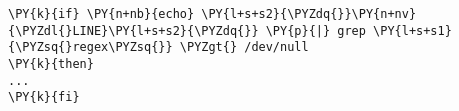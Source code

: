 \begin{Verbatim}[commandchars=\\\{\}]
\PY{k}{if} \PY{n+nb}{echo} \PY{l+s+s2}{\PYZdq{}}\PY{n+nv}{\PYZdl{}LINE}\PY{l+s+s2}{\PYZdq{}} \PY{p}{|} grep \PY{l+s+s1}{\PYZsq{}regex\PYZsq{}} \PYZgt{} /dev/null
\PY{k}{then}
...
\PY{k}{fi}
\end{Verbatim}
